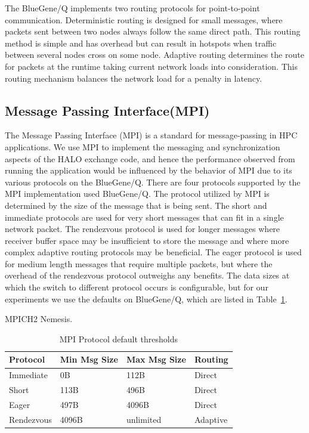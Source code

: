 \documentclass{acm_proc_article-sp}
\begin{document}
The BlueGene/Q implements two routing protocols for point-to-point communication.
Deterministic routing is designed for small messages, where packets sent between two nodes always follow the same direct path.
This routing method is simple and has overhead but can result in hotspots
when traffic between several nodes cross on some node.
Adaptive routing determines the route for packets at the runtime taking current network loads into consideration.
This routing mechanism balances the network load for a penalty in latency.


\subsection{Message Passing Interface(MPI)}
The Message Passing Interface (MPI) is a standard for message-passing in HPC applications.
We use MPI to implement the messaging and synchronization aspects of the HALO exchange code,
and hence the performance observed from running the application would be influenced by the behavior of MPI due to its various protocols on the BlueGene/Q.
There are four protocols supported by the MPI implementation used BlueGene/Q.
The protocol utilized by MPI is determined by the size of the message that is being sent.  The short and immediate protocols are used for very short
messages that can fit in a single network packet.  The rendezvous
protocol is used for longer messages where receiver buffer space may
be insufficient to store the message and where more complex adaptive
routing protocols may be beneficial.  The eager protocol
is used for medium length messages that require multiple packets,
but where the overhead of the rendezvous protocol outweighs any
benefits.
The data sizes at which the switch to different protocol occurs is configurable, but for our experiments we use the defaults on BlueGene/Q, which are 
listed in Table~\ref{table:bgq_protocols}.

MPICH2 Nemesis.

\begin{table}
  \caption{MPI Protocol default thresholds
    \label{table:bgq_protocols}}
  {\footnotesize
    \begin{tabular}{ | l | l | l | p{1.5cm} |}
    \hline
    Protocol   & Min Msg Size   & Max Msg Size  & Routing\\ \hline
    Immediate  &             0B &           112B & Direct\\ \hline
    Short      &           113B &           496B & Direct\\ \hline
    Eager      &           497B &          4096B & Direct\\ \hline
    Rendezvous &          4096B &      unlimited & Adaptive\\ \hline
    \hline
    \end{tabular}
  }
\end{table}
\end{document}
